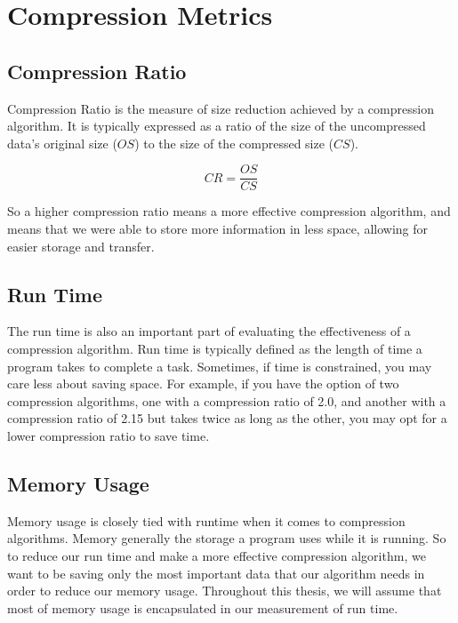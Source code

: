 \documentclass[12pt,twoside]{reedthesis}
\begin{document}
\hypertarget{compression-metrics}{%
\section{Compression Metrics}\label{compression-metrics}}

\hypertarget{compression-ratio}{%
\subsection{Compression Ratio}\label{compression-ratio}}

Compression Ratio is the measure of size reduction achieved by a compression algorithm. It is typically expressed as a ratio of the size of the uncompressed data's original size (\(OS\)) to the size of the compressed size (\(CS\)).

\[CR = \frac{OS}{CS}\]

So a higher compression ratio means a more effective compression algorithm, and means that we were able to store more information in less space, allowing for easier storage and transfer.

\hypertarget{run-time}{%
\subsection{Run Time}\label{run-time}}

The run time is also an important part of evaluating the effectiveness of a compression algorithm. Run time is typically defined as the length of time a program takes to complete a task. Sometimes, if time is constrained, you may care less about saving space. For example, if you have the option of two compression algorithms, one with a compression ratio of 2.0, and another with a compression ratio of 2.15 but takes twice as long as the other, you may opt for a lower compression ratio to save time.

\hypertarget{memory-usage}{%
\subsection{Memory Usage}\label{memory-usage}}

Memory usage is closely tied with runtime when it comes to compression algorithms. Memory generally the storage a program uses while it is running. So to reduce our run time and make a more effective compression algorithm, we want to be saving only the most important data that our algorithm needs in order to reduce our memory usage. Throughout this thesis, we will assume that most of memory usage is encapsulated in our measurement of run time.
\end{document}
